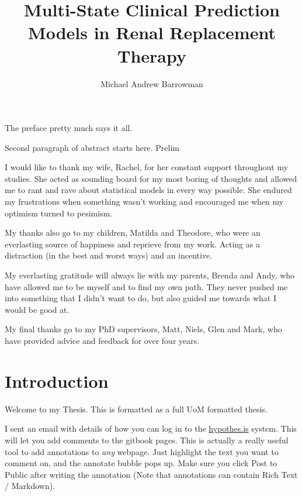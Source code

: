 \documentclass[12pt,PhD,twoside,openright]{muthesis}
\begin{document}
\title{Multi-State Clinical Prediction Models in Renal Replacement Therapy}
\author{Michael Andrew Barrowman}
\principaladviser{}
\faculty{}
\school{}
\beforeabstract

The preface pretty much says it all.

\par

Second paragraph of abstract starts here. Prelim

\afterabstract


\begingroup

\setlength{\parskip}{15pt}
\setlength{\parindent}{0pt}
I would like to thank my wife, Rachel, for her constant support throughout my studies. She acted as sounding board for my most boring of thoughts and allowed me to rant and rave about statistical models in every way possible. She endured my frustrations when something wasn't working and encouraged me when my optimism turned to pesimism.

\par

My thanks also go to my children, Matilda and Theodore, who were an everlasting source of happiness and reprieve from my work. Acting as a distraction (in the best and worst ways) and an incentive.

\par

My everlasting gratitude will always lie with my parents, Brenda and Andy, who have allowed me to be myself and to find my own path. They never pushed me into something that I didn't want to do, but also guided me towards what I would be good at.

\par

My final thanks go to my PhD supervisors, Matt, Niels, Glen and Mark, who have provided advice and feedback for over four years.
\endgroup
\afterpreface

\hypertarget{introduction}{%
\chapter*{Introduction}\label{introduction}}

Welcome to my Thesis. This is formatted as a full UoM formatted thesis.

I sent an email with details of how you can log in to the \href{https://hypothes.is/}{hypothes.is} system. This will let you add comments to the gitbook pages. This is actually a really useful tool to add annotations to \emph{any} webpage. Just highlight the text you want to comment on, and the annotate bubble pops up. Make sure you click Post to Public after writing the annotation (Note that annotations can contain Rich Text / Markdown).
\end{document}
